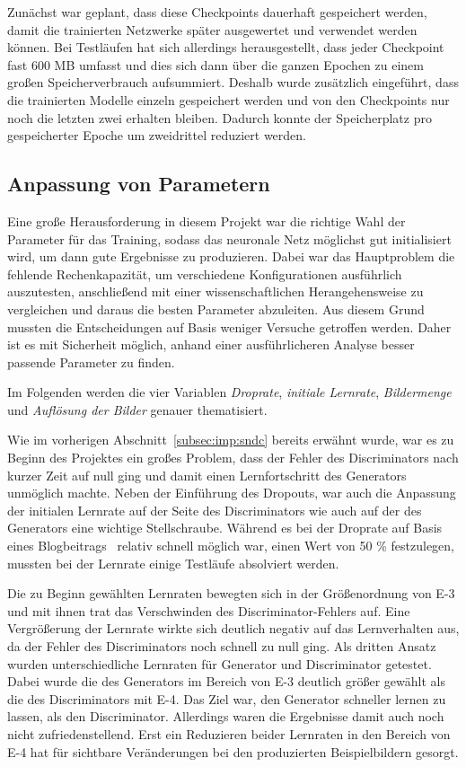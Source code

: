  Zunächst war geplant, dass diese Checkpoints dauerhaft gespeichert werden,
 damit die trainierten Netzwerke später ausgewertet und verwendet werden können.
 Bei Testläufen hat sich allerdings herausgestellt, dass jeder Checkpoint fast
 600 MB umfasst und dies sich dann über die ganzen Epochen zu einem großen
 Speicherverbrauch aufsummiert. Deshalb wurde zusätzlich eingeführt, dass die
 trainierten Modelle einzeln gespeichert werden und von den Checkpoints nur noch
 die letzten zwei erhalten bleiben. Dadurch konnte der Speicherplatz pro
 gespeicherter Epoche um zweidrittel reduziert werden.
 
 \subsection{Anpassung von Parametern} %
 
 Eine große Herausforderung in diesem Projekt war die richtige Wahl der
 Parameter für das Training, sodass das neuronale Netz möglichst gut
 initialisiert wird, um dann gute Ergebnisse zu produzieren. Dabei war das
 Hauptproblem die fehlende Rechenkapazität, um verschiedene Konfigurationen
 ausführlich auszutesten, anschließend mit einer wissenschaftlichen
 Herangehensweise zu vergleichen und daraus die besten Parameter abzuleiten. Aus
 diesem Grund mussten die Entscheidungen auf Basis weniger Versuche getroffen
 werden. Daher ist es mit Sicherheit möglich, anhand einer ausführlicheren
 Analyse besser passende Parameter zu finden.
 
 Im Folgenden werden die vier Variablen \emph{Droprate}, \emph{initiale
 Lernrate}, \emph{Bildermenge} und \emph{Auflösung der Bilder} genauer
 thematisiert.
 
 Wie im vorherigen Abschnitt~\ref{subsec:imp:sndc} bereits erwähnt wurde, war es
 zu Beginn des Projektes ein großes Problem, dass der Fehler des Discriminators
 nach kurzer Zeit auf null ging und damit einen Lernfortschritt des Generators
 unmöglich machte. Neben der Einführung des Dropouts, war auch die Anpassung der
 initialen Lernrate auf der Seite des Discriminators wie auch auf der des
 Generators eine wichtige Stellschraube. Während es bei der Droprate auf Basis
 eines Blogbeitrags~\cite{brownlee2019} relativ schnell möglich war, einen Wert
 von 50 \% festzulegen, mussten bei der Lernrate einige Testläufe absolviert
 werden. 
 
 Die zu Beginn gewählten Lernraten bewegten sich in der Größenordnung von E-3
 und mit ihnen trat das Verschwinden des Discriminator-Fehlers auf. Eine
 Vergrößerung der Lernrate wirkte sich deutlich negativ auf das Lernverhalten
 aus, da der Fehler des Discriminators noch schnell zu null ging. Als dritten
 Ansatz wurden unterschiedliche Lernraten für Generator und Discriminator
 getestet. Dabei wurde die des Generators im Bereich von E-3 deutlich größer
 gewählt als die des Discriminators mit E-4. Das Ziel war, den Generator
 schneller lernen zu lassen, als den Discriminator. Allerdings waren die
 Ergebnisse damit auch noch nicht zufriedenstellend. Erst ein Reduzieren beider
 Lernraten in den Bereich von E-4 hat für sichtbare Veränderungen bei den
 produzierten Beispielbildern gesorgt.
 
